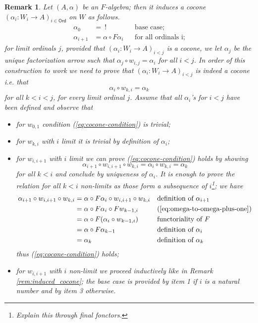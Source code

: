 \documentclass[letterpaper, 11pt, oneside]{memoir}
\theoremstyle{myteo}
\newtheorem{remark}[theorem]{Remark}
\numberwithin{equation}{section}
\newcommand{\Ord}{\textsf{Ord}}
\begin{document}
\begin{remark}
  \label{rem:induce-transfinite-cocone}
  Let \((A, \alpha)\) be an \(F\)-algebra; then it induces a cocone \((\alpha_i : W_i \to A)_{i \in \Ord}\) on \(W\) as follows.
  \begin{align*}
    \alpha_0 &=\ ! && \text{base case};\\
    \alpha_{i+1} &= \alpha \circ F\alpha_i && \text{for all ordinals i};
  \end{align*}
  for limit ordinals \(j\), provided that \((\alpha_i : W_i \to A)_{i < j}\) is a cocone, we let \(\alpha_{j}\) be the unique factorization arrow such that \(\alpha_j \circ w_{i,j} = \alpha_i\) for all \(i < j\).
  In order of this construction to work we need to prove that \((\alpha_i : W_i \to A)_{i < j}\) is indeed a cocone i.e. that
  \begin{equation}
    \label{eq:cocone-condition}
    \alpha_i \circ w_{k, i} = \alpha_{k}
  \end{equation}
  for all \(k < i < j\), for every limit ordinal \(j\).
  Assume that all \(\alpha_i\)'s for \(i < j\) have been defined and observe that
  \begin{itemize}
  \item[1.] for \(w_{0,1}\) condition (\ref{eq:cocone-condition}) is trivial;
  \item[2.] for \(w_{k, i}\) with \(i\) limit it is trivial by definition of \(\alpha_{i}\);
  \item[3.] for \(w_{i, i+1}\) with \(i\) limit we can prove (\ref{eq:cocone-condition}) holds by showing
    \[\alpha_{i+1} \circ w_{i, i+1} \circ w_{k, i} = \alpha_i \circ w_{k, i} =  \alpha_{k}\]
    for all \(k < i\) and conclude by uniqueness of \(\alpha_i\).
    It is enough to prove the relation for all \(k < i\) non-limits as those form a subsequence of \(i\)\footnote{Explain this through final fonctors.}; we have
    \begin{align*}
      \alpha_{i+1} \circ w_{i, i+1} \circ w_{k, i} &= \alpha \circ F\alpha_i \circ w_{i, i+1} \circ w_{k, i} && \text{definition of \(\alpha_{i+1}\)}\\
                                      &= \alpha \circ F\alpha_i \circ Fw_{k-1, i} && \text{(\ref{eq:omega-to-omega-plus-one})} \\
                                      &= \alpha \circ F(\alpha_i \circ w_{k-1, i}) && \text{functoriality of \(F\)}\\
                                      &= \alpha \circ F\alpha_{k-1} && \text{definition of \(\alpha_{i}\)}\\
                                      &= \alpha_k && \text{definition of \(\alpha_k\)}
    \end{align*}
    thus (\ref{eq:cocone-condition}) holds;
  \item[4.] for \(w_{i,i+1}\) with \(i\) non-limit we proceed inductively like in Remark \ref{rem:induced_cocone}; the base case is provided by item 1 if \(i\) is a natural number and by item 3 otherwise.
  \end{itemize}
\end{remark}
  

\printbibliography
\end{document}
